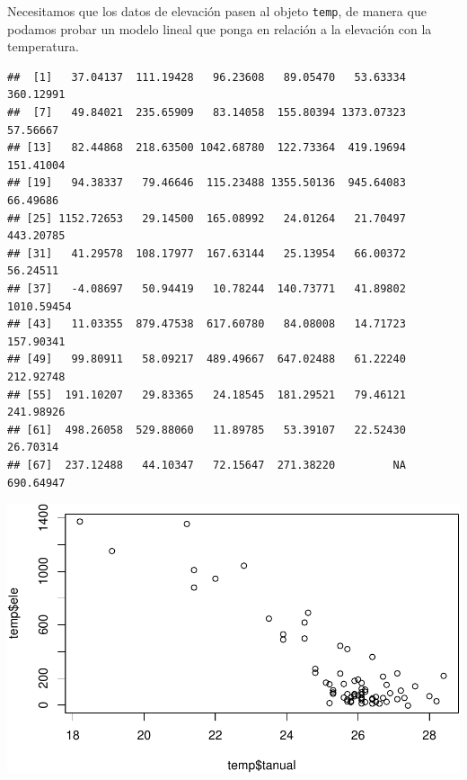 \documentclass[11pt,]{article}
\newenvironment{Shaded}{\begin{snugshade}}{\end{snugshade}}
\newcommand{\KeywordTok}[1]{\textcolor[rgb]{0.13,0.29,0.53}{\textbf{#1}}}
\newcommand{\DecValTok}[1]{\textcolor[rgb]{0.00,0.00,0.81}{#1}}
\newcommand{\StringTok}[1]{\textcolor[rgb]{0.31,0.60,0.02}{#1}}
\newcommand{\CommentTok}[1]{\textcolor[rgb]{0.56,0.35,0.01}{\textit{#1}}}
\newcommand{\OperatorTok}[1]{\textcolor[rgb]{0.81,0.36,0.00}{\textbf{#1}}}
\newcommand{\NormalTok}[1]{#1}
\begin{document}
Necesitamos que los datos de elevación pasen al objeto \texttt{temp}, de
manera que podamos probar un modelo lineal que ponga en relación a la
elevación con la temperatura.

\begin{Shaded}
\end{Shaded}

\begin{verbatim}
##  [1]   37.04137  111.19428   96.23608   89.05470   53.63334  360.12991
##  [7]   49.84021  235.65909   83.14058  155.80394 1373.07323   57.56667
## [13]   82.44868  218.63500 1042.68780  122.73364  419.19694  151.41004
## [19]   94.38337   79.46646  115.23488 1355.50136  945.64083   66.49686
## [25] 1152.72653   29.14500  165.08992   24.01264   21.70497  443.20785
## [31]   41.29578  108.17977  167.63144   25.13954   66.00372   56.24511
## [37]   -4.08697   50.94419   10.78244  140.73771   41.89802 1010.59454
## [43]   11.03355  879.47538  617.60780   84.08008   14.71723  157.90341
## [49]   99.80911   58.09217  489.49667  647.02488   61.22240  212.92748
## [55]  191.10207   29.83365   24.18545  181.29521   79.46121  241.98926
## [61]  498.26058  529.88060   11.89785   53.39107   22.52430   26.70314
## [67]  237.12488   44.10347   72.15647  271.38220         NA  690.64947
\end{verbatim}

\begin{Shaded}
\end{Shaded}

\includegraphics[width=600px]{proyecto_files/figure-latex/agregar-y-modelo-1}
\end{document}
